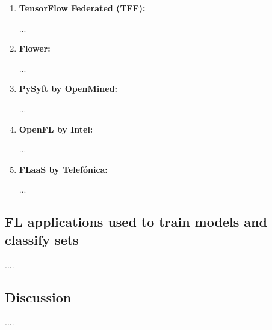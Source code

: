\begin{enumerate}
	\item \textbf{TensorFlow Federated (TFF):}
	
	...
	\item \textbf{Flower:}
	 
	...
	\item \textbf{PySyft by OpenMined:}
	 
	...
	\item \textbf{OpenFL by Intel:}
	 
	...
	\item \textbf{FLaaS by Telefónica:}
	
	...
	
\end{enumerate}

\subsection{FL applications used to train models and classify sets}
\label{sec:fl_apps_fl_frameworks}

....


\subsection{Discussion}
\label{sec:discussion_fl_frameworks}

....



